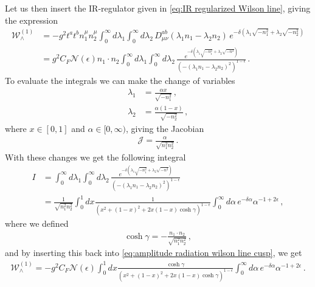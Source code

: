Let us then insert the IR-regulator given in \cref{eq:IR regularized Wilson line}, giving the expression
\begin{align}\label{eq:amplitude radiation wilson line cusp}
    \mathcal{W}_{\wedge}^{(1)}&=-g^{2}t^{a}t^{b}n_{1}^{\mu} n_{2}^{\mu}\int_{0}^{\infty}d\lambda_{1}\int_{0}^{\infty}d\lambda_{2}\,D_{\mu\nu}^{ab}(\lambda_{1}n_1-\lambda_{2}n_2)\,e^{-\delta(\lambda_1\sqrt{-n_{1}^{2}}+\lambda_2\sqrt{-n_{2}^{2}})}\nonumber
    \\
    &=g^{2}C_{F}\mathcal{N}(\epsilon)n_{1}\cdot n_{2}\int_{0}^{\infty}d\lambda_{1}\int_{0}^{\infty}d\lambda_{2}\,\frac{e^{-\delta(\lambda_1\sqrt{-n_{1}^{2}}+\lambda_2\sqrt{-n_{}^{2}})}}{(-(\lambda_{1}n_{1}-\lambda_{2}n_{2})^{2})^{1-\epsilon}}\,.
\end{align}
To evaluate the integrals we can make the change of variables
\begin{align}
    \lambda_1&=\frac{\alpha x}{\sqrt{-n_{1}^{2}}}\,,
    \\
    \lambda_{2}&=\frac{\alpha(1-x)}{\sqrt{-n_{2}^{2}}}\,,
\end{align}
where $x\in[0,1]$ and $\alpha\in[0,\infty)$, giving the Jacobian
\begin{align}
    \mathcal{J}=\frac{\alpha}{\sqrt{n_{1}^{2}n_{2}^{2}}}\,.
\end{align}
With these changes we get the following integral
\begin{align}
    I&=\int_{0}^{\infty}d\lambda_{1}\int_{0}^{\infty}d\lambda_{2}\,\frac{e^{-\delta(\lambda_1\sqrt{-n_{1}^{2}}+\lambda_2\sqrt{-n_{}^{2}})}}{(-(\lambda_{1}n_{1}-\lambda_{2}n_{2})^{2})^{1-\epsilon}}\nonumber
    \\
    &=\frac{1}{\sqrt{n_{1}^{2}n_{2}^{2}}}\int_{0}^{1}dx \frac{1}{(x^{2}+(1-x)^{2}+2x(1-x)\cosh\gamma)^{1-\epsilon}}\int_{0}^{\infty}d\alpha\,e^{-\delta\alpha}\alpha^{-1+2\epsilon}\,,
\end{align}
where we defined 
\begin{align}\label{eq:gamma minkowski}
    \cosh\gamma=-\frac{n_{1}\cdot n_{2}}{\sqrt{n_{1}^{2}n_{2}^{2}}}\,,
\end{align}
and by inserting this back into \cref{eq:amplitude radiation wilson line cusp}, we get
\begin{align}
    \mathcal{W}_{\wedge}^{(1)}=-g^{2}C_{F}\mathcal{N}(\epsilon)\int_{0}^{1}dx\frac{\cosh\gamma}{(x^{2}+(1-x)^{2}+2x(1-x)\cosh\gamma)^{1-\epsilon}}\int_{0}^{\infty}d\alpha\,e^{-\delta\alpha}\alpha^{-1+2\epsilon}\,.
\end{align}

